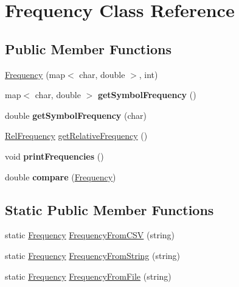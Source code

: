 \hypertarget{classFrequency}{}\section{Frequency Class Reference}
\label{classFrequency}
\subsection*{Public Member Functions}
\begin{DoxyCompactItemize}
\item 
\hyperlink{classFrequency_aee3a222d9a2c90ed28f3e08c20a661f3}{Frequency} (map$<$ char, double $>$, int)
\item 
\mbox{\label{classFrequency_a39b7092591845fc4d32c51849c8b69cc}} 
map$<$ char, double $>$ {\bfseries get\+Symbol\+Frequency} ()
\item 
\mbox{\label{classFrequency_aebdcb9e2e49f7ecfb29c0ffb287eb8d2}} 
double {\bfseries get\+Symbol\+Frequency} (char)
\item 
\hyperlink{classRelFrequency}{Rel\+Frequency} \hyperlink{classFrequency_ad26f1ea2a3952447a6188d73cd26ca16}{get\+Relative\+Frequency} ()
\item 
\mbox{\label{classFrequency_a4a55e109f83877daf7c4594f7a876d3f}} 
void {\bfseries print\+Frequencies} ()
\item 
\mbox{\label{classFrequency_a76eb9ce63ed4658fbf6888e29414eb02}} 
double {\bfseries compare} (\hyperlink{classFrequency}{Frequency})
\end{DoxyCompactItemize}
\subsection*{Static Public Member Functions}
\begin{DoxyCompactItemize}
\item 
static \hyperlink{classFrequency}{Frequency} \hyperlink{classFrequency_afa743a740aba09aa200406693c11afe8}{Frequency\+From\+C\+SV} (string)
\item 
static \hyperlink{classFrequency}{Frequency} \hyperlink{classFrequency_a1f7df4dabf9cdf839f9884ee844c6752}{Frequency\+From\+String} (string)
\item 
static \hyperlink{classFrequency}{Frequency} \hyperlink{classFrequency_ae46fea585785720e124b45643914f4c6}{Frequency\+From\+File} (string)
\end{DoxyCompactItemize}


